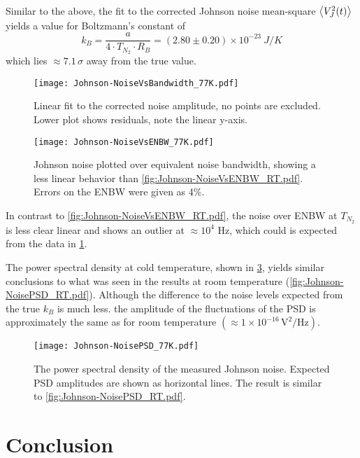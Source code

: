 Similar to the above, the fit to the corrected Johnson noise mean-square $\expval{V_J^2(t)}$ yields a value for Boltzmann's constant of
\begin{equation}
k_B = \frac{a}{4 \cdot T_{N_2} \cdot R_B} = (2.80 \pm 0.20) \times 10^{-23} \SI{}{J/K}
\end{equation}
which lies $\approx 7.1 \,\sigma$ away from the true value.

\begin{figure}[H]
	\centering
	\texttt{[image: Johnson-NoiseVsBandwidth\_77K.pdf]}
	\caption{Linear fit to the corrected noise amplitude, no points are excluded. Lower plot shows residuals, note the linear y-axis.}
	\label{fig:Johnson-NoiseVsBandwidth_77K.pdf}
\end{figure}

\begin{figure}[H]
	\centering
	\texttt{[image: Johnson-NoiseVsENBW\_77K.pdf]}
	\caption{Johnson noise plotted over equivalent noise bandwidth, showing a less linear behavior than \cref{fig:Johnson-NoiseVsENBW_RT.pdf}. Errors on the ENBW were given as 4\%.}
	\label{fig:Johnson-NoiseVsENBW_77K.pdf}
\end{figure}

In contrast to \cref{fig:Johnson-NoiseVsENBW_RT.pdf}, the noise over ENBW at $T_{N_2}$ is less clear linear and shows an outlier at $\approx 10^4$ Hz, which could is expected from the data in \cref{fig:Johnson-NoiseVsBandwidth_77K.pdf}.

The power spectral density at cold temperature, shown in \cref{fig:Johnson-NoisePSD_77K.pdf}, yields similar conclusions to what was seen in the results at room temperature (\cref{fig:Johnson-NoisePSD_RT.pdf}). Although the difference to the noise levels expected from the true $k_B$ is much less. the amplitude of the fluctuations of the PSD is approximately the same as for room temperature $(\approx 1 \times 10^{-16} \,\mathrm{V}^2/\mathrm{Hz} )$.


\begin{figure}[H]
	\centering
	\texttt{[image: Johnson-NoisePSD\_77K.pdf]}
	\caption{The power spectral density of the measured Johnson noise.  Expected PSD amplitudes are shown as horizontal lines. The result is similar to \cref{fig:Johnson-NoisePSD_RT.pdf}.}
	\label{fig:Johnson-NoisePSD_77K.pdf}
\end{figure}



\clearpage
\section{Conclusion}

